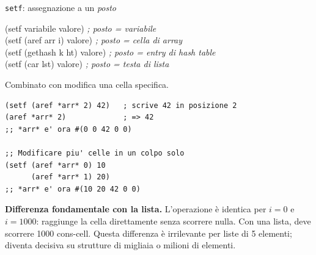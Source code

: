 \begin{tcolorbox}[
  enhanced,
  colback=black!2, colframe=black!20,
  arc=3pt, boxrule=0.4pt,
  left=12pt, right=12pt, top=9pt, bottom=9pt,
  before skip=8pt, after skip=10pt
]
\begin{concetto}{\texttt{setf}: assegnazione a un \emph{posto}}
\label{sec:setf-places}

\begin{sintassi}
(setf variabile       valore)  \textit{; posto = variabile}\\
(setf (aref arr i)    valore)  \textit{; posto = cella di array}\\
(setf (gethash k ht)  valore)  \textit{; posto = entry di hash table}\\
(setf (car lst)       valore)  \textit{; posto = testa di lista}
\end{sintassi}

\end{concetto}

Combinato con  modifica una cella specifica.

\begin{tcolorbox}[
  enhanced, colback=clBg, colframe=gray!40,
  arc=2pt, boxrule=0.4pt,
  left=8pt, right=6pt, top=4pt, bottom=4pt,
  before skip=4pt, after skip=4pt
]
\begin{lstlisting}
(setf (aref *arr* 2) 42)   ; scrive 42 in posizione 2
(aref *arr* 2)             ; => 42
;; *arr* e' ora #(0 0 42 0 0)

;; Modificare piu' celle in un colpo solo
(setf (aref *arr* 0) 10
      (aref *arr* 1) 20)
;; *arr* e' ora #(10 20 42 0 0)
\end{lstlisting}
\end{tcolorbox}

\textbf{Differenza fondamentale con la lista.}
L'operazione  è identica per $i = 0$ e $i = 1000$:
raggiunge la cella direttamente senza scorrere nulla.
Con una lista,  deve scorrere 1000 cons-cell.
Questa differenza è irrilevante per liste di 5 elementi;
diventa decisiva su strutture di migliaia o milioni di elementi.


\end{tcolorbox}
